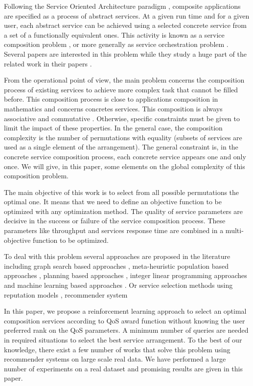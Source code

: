 \documentclass[10pt,journal,compsoc]{IEEEtran}
\begin{document}
Following  the Service Oriented Architecture paradigm \cite{Alrifai:2010}, composite applications are specified as a process of abstract services. At a given run time and for a given user, each abstract service can be achieved using a selected concrete service from a set of a functionally equivalent ones. This activity is known as a service composition problem \cite{stelmach2013}, or more generally as service orchestration problem \cite{Papazoglou2007}. Several papers are interested in this problem while they study a huge part of the related work in their papers \cite{Essaid2017,Zheng2015}. 

From the operational point of view, the main problem concerns the composition process of existing services to achieve more complex task that cannot be filled before. This composition process is close to applications composition in mathematics and concerns concretes services. This composition is always associative and commutative \cite{GABREL2015}. Otherwise, specific constraints must be given to limit the impact of these properties. In the general case, the composition complexity is the number of permutations with equality (subsets of services are used as a single element of the arrangement). The general constraint is, in the concrete service composition process, each concrete service appears one and only once. We will give, in this paper, some elements on the global complexity of this composition problem. 

The main objective of this work is to select from all possible permutations the optimal one.  It means that we need to define an objective function to be optimized with any optimization method. The quality of service parameters are decisive in the success or failure of the service composition process. These parameters like throughput and services response time are combined in a multi-objective function to be optimized.  

To deal with this problem several approaches are proposed in the literature including graph search based approaches \cite{deng2014,jiang2014,Rodriguez2016,Siebert2015}, meta-heuristic population based approaches \cite{Deng2017,Deng2016c,Chandra2016,Wu2016,Zheng2015}, planning based approaches \cite{chen2017,Zou2014}, integer linear programming approaches \cite{} and machine learning based approaches \cite{Deng2016s,Deng2016m,Rao2011,BenMabrouk2009}. Or service selection methods using reputation models \cite{Wang2007,Wang2011},  recommender system \cite{Manikrao2005,Liu2005}

In this paper, we propose a reinforcement learning approach to select an optimal composition services according to QoS award function without knowing the user preferred rank on the QoS parameters. A minimum number of queries are needed in required situations to select the best service arrangement. To the best of our knowledge, there exist a few number of works that solve this problem using recommender systems on large scale real data. We have performed a large number of experiments on a real dataset \cite{Zheng2014} and promising results are given in this paper.
\end{document}
